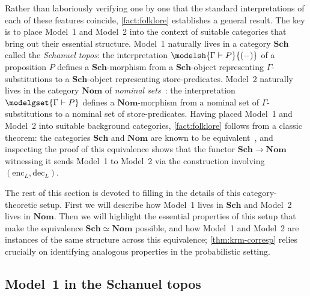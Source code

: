 \documentclass[
  sigconf,
  screen, ]{acmart}
\theoremstyle{definition}
\newcommand\nref[2]{\hyperref[#1]{#2}} \newcommand\checkhigh{{\huge{\color{red}\textbf{TODO: check}}}}
\newcommand\Sch{{\nref{def:Sch}{\mathbf{Sch}}}}
\newcommand\enc{\mathrm{enc}}
\newcommand\dec{\mathrm{dec}}
\newcommand\Nom{{\nref{def:Nom}{\mathbf{Nom}}}}
\begin{document}
Rather than laboriously verifying one by one
that the standard interpretations of
each of these features coincide,
\cref{fact:folklore} establishes a general result.
The key is to place Model~1 and Model~2
into the context of suitable categories
that bring out their essential structure.
Model~1
naturally lives in a category $\Sch$
called the \emph{Schanuel topos}:
the interpretation $\modelsh{\Gamma\vdash P}{(-)}$
of a proposition $P$ defines a $\Sch$-morphism
from a $\Sch$-object representing $\Gamma$-substitutions
to a $\Sch$-object representing store-predicates.
Model~2 naturally lives
in the category $\Nom$
of \emph{nominal sets}~\cite{pitts2013nominal}:
the interpretation
$\modelgset{\Gamma\vdash P}$
defines a $\Nom$-morphism from a nominal set
of $\Gamma$-substitutions to a nominal set of store-predicates.
Having placed Model~1 and Model~2
into suitable
background categories,
\cref{fact:folklore} follows from
a classic theorem:
the categories $\Sch$ and $\Nom$
are known to be equivalent~\cite[\S 6.3]{pitts2013nominal},
and inspecting the proof of this equivalence
shows that the functor $\Sch\to\Nom$ witnessing it
sends Model~1 to Model~2 via the construction
involving $(\enc_L,\dec_L)$.

The rest of this section is devoted to filling
in the details of this category-theoretic setup.
First we will describe how Model~1 lives in $\Sch$
and Model~2 lives in $\Nom$.
Then we will highlight the essential properties
of this setup that make the equivalence $\Sch\simeq\Nom$
possible,
and how Model~1 and Model~2
are instances of the same structure
across this equivalence;
\cref{thm:krm-corresp}
relies crucially on
identifying analogous properties in the probabilistic setting.

\subsection{Model~1 in the Schanuel topos} \label{sec:schanuel-topos}
\newcommand\Extension{\nref{def:Extension}{Extension}}
\newcommand\Renaming{\nref{def:Renaming}{Renaming}}
\newcommand\Restriction{\nref{def:Restriction}{Restriction}}
\end{document}
